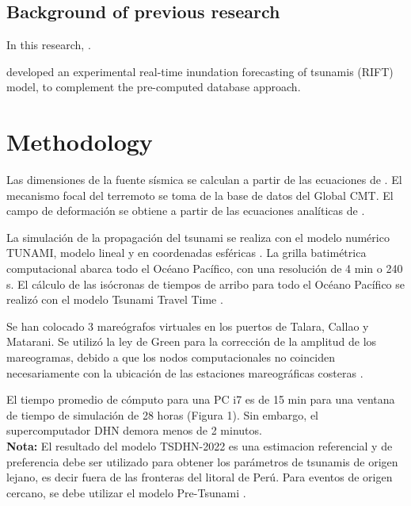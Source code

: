 \documentclass[a4paper,11pt,twoside]{article}
\begin{document}

\subsection*{Background of previous research}
In this research, .

\cite{Wan2012} developed an experimental real-time inundation forecasting of tsunamis (RIFT) model, to complement the pre-computed database approach.



\section*{Methodology}
Las dimensiones de la fuente sísmica se calculan a partir de las ecuaciones de \cite{Pap2004}. El mecanismo focal del terremoto se toma de la base de datos del Global CMT. El campo de deformación se obtiene a partir de las ecuaciones analíticas de \cite{Oka1992}.

La simulación de la propagación del tsunami se realiza con el modelo numérico TUNAMI, modelo lineal y en coordenadas esféricas \citep{Ima2006}. La grilla batimétrica computacional abarca todo el Océano Pacífico, con una resolución de 4 min o 240 s. El cálculo de las isócronas de tiempos de arribo para todo el Océano Pacífico se realizó con el modelo Tsunami Travel Time \citep{Wes2009}. 

Se han colocado 3 mareógrafos virtuales en los puertos de Talara, Callao y 
Matarani. Se utilizó la ley de Green para la corrección de la amplitud de 
los mareogramas, debido a que los nodos computacionales no coinciden 
necesariamente con la ubicación de las estaciones mareográficas costeras \citep{Sat2015}.

El tiempo promedio de cómputo para una PC i7 es de 15 min para una ventana 
de tiempo de simulación de 28 horas (Figura 1). Sin embargo, el 
supercomputador DHN demora menos de 2 minutos. \\

\noindent \textbf{Nota:} El resultado del modelo TSDHN-2022 es una estimacion referencial y de preferencia debe ser utilizado para obtener los parámetros de tsunamis de origen lejano, es decir fuera de las fronteras del litoral de Perú. Para eventos de origen cercano, se debe utilizar el modelo Pre-Tsunami \citep{Jim2018}.
\end{document}
